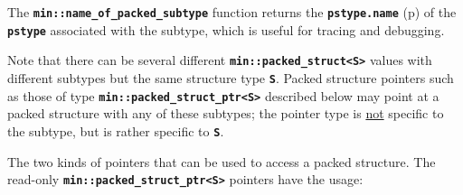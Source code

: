 \documentclass[12pt]{article}
\newcommand{\TT}[1]{{\tt \bfseries #1}}
\newcommand{\pagref}[1]{p\pageref{#1}}
\newcommand{\EOL}{\penalty \exhyphenpenalty}
\begin{document}
The \TT{min::name\_of\_packed\_subtype} function returns the
\TT{pstype.name} (\pagref{NAME_IN_PACKED_STRUCT}) of the
\TT{pstype} associated
with the subtype, which is useful for tracing and debugging.

Note that there can be several different
\TT{min::\EOL packed\_\EOL struct<S>}
values with different subtypes but the same structure
type \TT{S}.  Packed structure pointers such as those of type
\TT{min::\EOL packed\_\EOL struct\_\EOL ptr<S>}
described below may point at a packed structure with any of these subtypes;
the pointer type is \underline{not} specific to the subtype, but
is rather specific to \TT{S}.

The two kinds of pointers that can be used to access
a packed structure.  The read-only
\TT{min::\EOL packed\_\EOL struct\_\EOL ptr<S>} pointers
have the usage:
\end{document}
